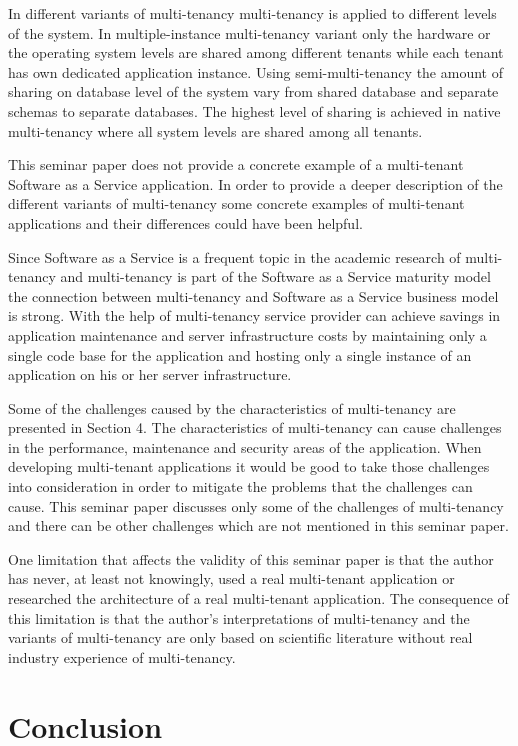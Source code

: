 \documentclass[conference]{sasmoota2017}
\begin{document}
In different variants of multi-tenancy multi-tenancy is applied to different levels of the system. In multiple-instance multi-tenancy variant only the hardware or the operating system levels are shared among different tenants while each tenant has own dedicated application instance. Using semi-multi-tenancy the amount of sharing on database level of the system vary from shared database and separate schemas to separate databases. The highest level of sharing is achieved in native multi-tenancy where all system levels are shared among all tenants. 

This seminar paper does not provide a concrete example of a multi-tenant Software as a Service application. In order to provide a deeper description of the different variants of multi-tenancy some concrete examples of multi-tenant applications and their differences could have been helpful. 

Since Software as a Service is a frequent topic in the academic research of multi-tenancy and multi-tenancy is part of the Software as a Service maturity model the connection between multi-tenancy and Software as a Service business model is strong. With the help of multi-tenancy service provider can achieve savings in application maintenance and server infrastructure costs by maintaining only a single code base for the application and hosting only a single instance of an application on his or her server infrastructure. 

Some of the challenges caused by the characteristics of multi-tenancy are presented in Section 4. The characteristics of multi-tenancy can cause challenges in the performance, maintenance and security areas of the application. When developing multi-tenant applications it would be good to take those challenges into consideration in order to mitigate the problems that the challenges can cause. This seminar paper discusses only some of the challenges of multi-tenancy and there can be other challenges which are not mentioned in this seminar paper.

One limitation that affects the validity of this seminar paper is that the author has never, at least not knowingly, used a real multi-tenant application or researched the architecture of a real multi-tenant application. The consequence of this limitation is that the author's interpretations of multi-tenancy and the variants of multi-tenancy are only based on scientific literature without real industry experience of multi-tenancy. 

\section{Conclusion}
\end{document}
